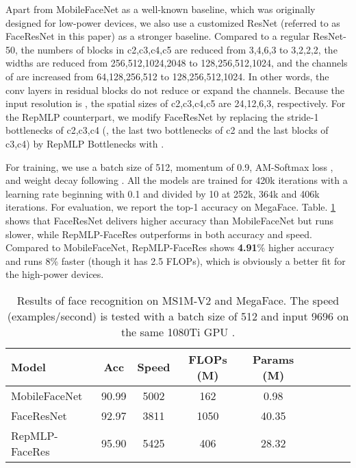 \documentclass[10pt,twocolumn,letterpaper]{article}
\begin{document}
Apart from MobileFaceNet \cite{chen2018mobilefacenets} as a well-known baseline, which was originally designed for low-power devices, we also use a customized ResNet (referred to as FaceResNet in this paper) as a stronger baseline. Compared to a regular ResNet-50, the numbers of blocks in c2,c3,c4,c5 are reduced from 3,4,6,3 to 3,2,2,2, the widths are reduced from 256,512,1024,2048 to 128,256,512,1024, and the channels of  are increased from 64,128,256,512 to 128,256,512,1024. In other words, the  conv layers in residual blocks do not reduce or expand the channels. Because the input resolution is , the spatial sizes of c2,c3,c4,c5 are 24,12,6,3, respectively. For the RepMLP counterpart, we modify FaceResNet by replacing the stride-1 bottlenecks of c2,c3,c4 (\ie, the last two bottlenecks of c2 and the last blocks of c3,c4) by RepMLP Bottlenecks with .

For training, we use a batch size of 512, momentum of 0.9, AM-Softmax loss \cite{wang2018additive}, and weight decay following \cite{chen2018mobilefacenets}. All the models are trained for 420k iterations with a learning rate beginning with 0.1 and divided by 10 at 252k, 364k and 406k iterations. For evaluation, we report the top-1 accuracy on MegaFace. Table. \ref{table-face} shows that FaceResNet delivers higher accuracy than MobileFaceNet but runs slower, while RepMLP-FaceRes outperforms in both accuracy and speed. Compared to MobileFaceNet, RepMLP-FaceRes shows \textbf{4.91}\% higher accuracy and runs 8\% faster (though it has 2.5 FLOPs), which is obviously a better fit for the high-power devices.

\setlength{\tabcolsep}{4pt}
\begin{table}
	\caption{Results of face recognition on MS1M-V2 and MegaFace. The speed (examples/second) is tested with a batch size of 512 and input 9696 on the same 1080Ti GPU .}
	\label{table-face}
	\vspace{-0.2in}
	\begin{center}
		\small
		\begin{tabular}{lcccccccc}
			\hline
			Model					&	Acc		&	 Speed		&	FLOPs (M)	&	Params (M) 	\\
			\hline
			MobileFaceNet			&	90.99		&	5002		&	162			&	0.98	\\
			FaceResNet				&	92.97		&	3811		&	1050		&	40.35		\\	
			RepMLP-FaceRes			&	95.90		&	5425		&	406			&	28.32	\\
			\hline
		\end{tabular}
	\end{center}
	\vspace{-0.25in}
\end{table}
\setlength{\tabcolsep}{1.4pt}
\end{document}
